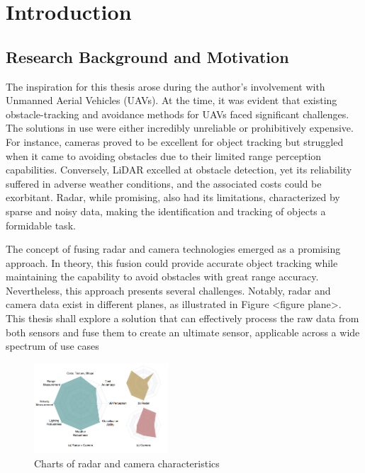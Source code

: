 \chapter{Introduction}\label{chap:intro}


\section{Research Background and Motivation}\label{sec:1-motivation}
The inspiration for this thesis arose during the author's involvement with Unmanned Aerial Vehicles (UAVs). 
At the time, it was evident that existing obstacle-tracking and avoidance methods for UAVs faced significant challenges. 
The solutions in use were either incredibly unreliable or prohibitively expensive.
For instance, cameras proved to be excellent for object tracking but struggled when it came to avoiding obstacles due to their limited range perception capabilities.
Conversely, LiDAR excelled at obstacle detection, yet its reliability suffered in adverse weather conditions, and the associated costs could be exorbitant. 
Radar, while promising, also had its limitations, characterized by sparse and noisy data, making the identification and tracking of objects a formidable task.

The concept of fusing radar and camera technologies emerged as a promising approach.
In theory, this fusion could provide accurate object tracking while maintaining the capability to avoid obstacles with great range accuracy. 
Nevertheless, this approach presents several challenges. 
Notably, radar and camera data exist in different planes, as illustrated in Figure <figure plane>.
This thesis shall explore a solution that can effectively process the raw data from both sensors 
and fuse them to create an ultimate sensor, applicable across a wide spectrum of use cases


\begin{figure}[hpbt]
    \centering
    \includegraphics[width=5cm]{Figures/trade_off.png}%
    \caption{Charts of radar and camera characteristics \cite{Yao_2023}}
    \label{fig:trade_off}
\end{figure}

